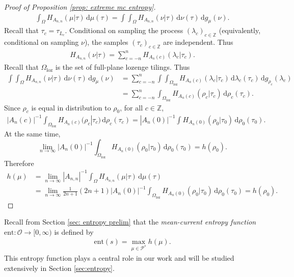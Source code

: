 \documentclass[11pt]{article}
\theoremstyle{remark}
\theoremstyle{definition}
\newcommand{\ent}{\text{ent}}
\newcommand{\mc}[1]{\mathcal{#1}}
\newcommand{\m}[1]{\mathbb{#1}}
\newcommand{\dd}{\mathrm{d}}
\begin{document}
\begin{proof}[Proof of Proposition \ref{prop: extreme mc entropy}]
\begin{align*}
     \int_{\Omega} H_{A_{n,n}}(\mu|\tau) \, \dd \mu(\tau)  = \int \int_{\Omega} H_{A_{n,n}}(\nu|\tau)\, \dd \nu(\tau) \, \dd g_\mu(\nu). 
\end{align*}
Recall that $\tau_c = \tau_{L_c}$. Conditional on sampling the process $(\lambda_c)_{c\in \m Z}$ (equivalently, conditional on sampling $\nu$), the samples $(\tau_c)_{c\in \m Z}$ are independent. Thus 
\begin{align*}
    H_{A_{n,n}}(\nu|\tau) = \sum_{c=-n}^n H_{A_{n}(c)}(\lambda_c|\tau_c). 
\end{align*}
Recall that $\Omega_{\text{loz}}$ is the set of full-plane lozenge tilings. Thus
\begin{align}\label{eq: ent independence split}
     \int \int_{\Omega} H_{A_{n,n}}(\nu|\tau)\, \dd \nu(\tau) \, \dd g_\mu(\nu)  &= \sum_{c=-n}^n \int \int_{\Omega_{\text{loz}}} H_{A_{n}(c)}(\lambda_c|\tau_c) \, \dd \lambda_c(\tau_c)\,\dd g_{\rho_c}(\lambda_c) \\ &= \sum_{c=-n}^n \int_{\Omega_{\text{loz}}} H_{A_{n}(c)}(\rho_c|\tau_c) \, \dd {\rho_c}(\tau_c).
\end{align}
Since $\rho_c$ is equal in distribution to $\rho_0$, for all $c\in \m Z$, 
\begin{align*}
    |A_n(c)|^{-1}\int_{\Omega_{\text{loz}}} H_{A_{n}(c)}(\rho_c|\tau_c)\, \dd {\rho_c}(\tau_c) = |A_n(0)|^{-1} \int H_{A_{n}(0)}(\rho_0|\tau_0)\, \dd {\rho_0}(\tau_0).
\end{align*}
At the same time, 
\begin{equation}\label{eq: ent rho}
    \lim_{n\to \infty} |A_n(0)|^{-1} \int_{\Omega_{\text{loz}}} H_{A_{n}(0)}(\rho_0|\tau_0)\, \dd {\rho_0}(\tau_0) =  h(\rho_0). 
\end{equation}
Therefore 
\begin{align*}
    h(\mu) &= \lim_{n\to \infty} |A_{n,n}|^{-1} \int_{\Omega} H_{A_{n,n}}(\mu|\tau)\,\dd \mu(\tau) \\ &= \lim_{n\to \infty} \frac{1}{2n+1} (2n+1) |A_n(0)|^{-1} \int_{\Omega_{\text{loz}}} H_{A_{n}(0)}(\rho_0|\tau_0)\, \dd {\rho_0}(\tau_0) = h(\rho_0). 
\end{align*}
\end{proof}

Recall from Section \ref{sec: entropy prelim} that the \textit{mean-current entropy function} $\ent: \mc O\to [0,\infty)$ is defined by 
\begin{align*}
    \ent(s) = \max_{\mu\in \mc P^s} h(\mu). 
\end{align*}
This entropy function plays a central role in our work and will be studied extensively in Section  \ref{sec:entropy}. 
\end{document}
